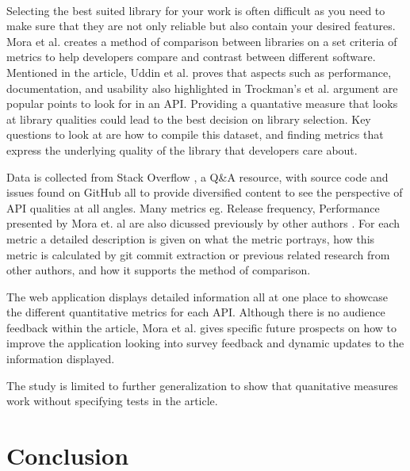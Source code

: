 \documentclass[12pt]{article}
\begin{document}
\paragraph{}
Selecting the best suited library for your work is often difficult as you need to make sure that they are not only reliable but also contain your desired features.
Mora et al. \cite{metrics} creates a method of comparison between libraries on a set criteria of metrics to help developers
compare and contrast between different software. Mentioned in the article, Uddin et al. \cite{analogical} proves that aspects
such as performance, documentation, and usability also highlighted in Trockman's et al. \cite{githubbadges} argument are
popular points to look for in an API.
Providing a quantative measure that looks at library qualities could lead to the best decision on library selection.
Key questions to look at are how to compile this dataset, and finding metrics that express the underlying quality of the library that developers care about.

Data is collected from Stack Overflow \cite{stackoverflow}, a Q\&A resource, with source code and issues found on GitHub \cite{github} all to provide
diversified content to see the perspective of API qualities at all angles. Many metrics eg. Release frequency, Performance presented by Mora et. al \cite{metrics} are also
dicussed previously by other authors \cite{apiwave,analogical,githubbadges,opinerarticle}.
For each metric a detailed description is given on what the metric portrays, how this metric is calculated by git commit extraction 
or previous related research from other authors, and how it supports the method of comparison.

The web application displays detailed information all at one place to showcase the different quantitative metrics for each API. 
Although there is no audience feedback within the article, Mora et al. \cite{metrics} gives specific future prospects on how
to improve the application looking into survey feedback and dynamic updates to the information displayed. 

The study is limited to further generalization to show that quanitative measures work without specifying tests in the article. 


\newpage 
\section{Conclusion}
\end{document}
